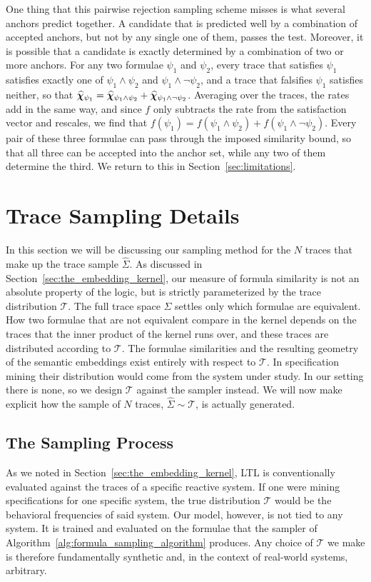 \documentclass[titlepage,a4paper,11pt]{report}
\begin{document}
    One thing that this pairwise rejection sampling scheme misses is what several anchors predict together. A candidate that is predicted well by a combination of accepted anchors, but not by any single one of them, passes the test. Moreover, it is possible that a candidate is exactly determined by a combination of two or more anchors. For any two formulae $\psi_1$ and $\psi_2$, every trace that satisfies $\psi_1$ satisfies exactly one of $\psi_1\land\psi_2$ and $\psi_1\land\neg\psi_2$, and a trace that falsifies $\psi_1$ satisfies neither, so that $\bm{\widehat\chi}_{\psi_1}=\bm{\widehat\chi}_{\psi_1\land\psi_2}+\bm{\widehat\chi}_{\psi_1\land\neg\psi_2}$. Averaging over the traces, the rates add in the same way, and since $f$ only subtracts the rate from the satisfaction vector and rescales, we find that $f(\psi_1)=f(\psi_1\land\psi_2)+f(\psi_1\land\neg\psi_2)$. Every pair of these three formulae can pass through the imposed similarity bound, so that all three can be accepted into the anchor set, while any two of them determine the third. We return to this in Section~\ref{sec:limitations}.

    
    \section{Trace Sampling Details} \label{sec:trace_sampling_details}
    In this section we will be discussing our sampling method for the $N$ traces that make up the trace sample $\widehat \Sigma$. As discussed in Section~\ref{sec:the_embedding_kernel}, our measure of formula similarity is not an absolute property of the logic, but is strictly parameterized by the trace distribution $\mathcal{T}$. The full trace space $\Sigma$ settles only which formulae are equivalent. How two formulae that are not equivalent compare in the kernel depends on the traces that the inner product of the kernel runs over, and these traces are distributed according to $\mathcal T$. The formulae similarities and the resulting geometry of the semantic embeddings exist entirely with respect to $\mathcal{T}$. In specification mining their distribution would come from the system under study. In our setting there is none, so we design $\mathcal T$ against the sampler instead. We will now make explicit how the sample of $N$ traces, $\widehat\Sigma \sim \mathcal{T}$, is actually generated.
 
    \subsection{The Sampling Process}\label{sec:sampling_process}
    As we noted in Section~\ref{sec:the_embedding_kernel}, LTL is conventionally evaluated against the traces of a specific reactive system. If one were mining specifications for one specific system, the true distribution $\mathcal{T}$ would be the behavioral frequencies of said system. Our model, however, is not tied to any system. It is trained and evaluated on the formulae that the sampler of Algorithm~\ref{alg:formula_sampling_algorithm} produces. Any choice of $\mathcal{T}$ we make is therefore fundamentally synthetic and, in the context of real-world systems, arbitrary.
 
\end{document}

